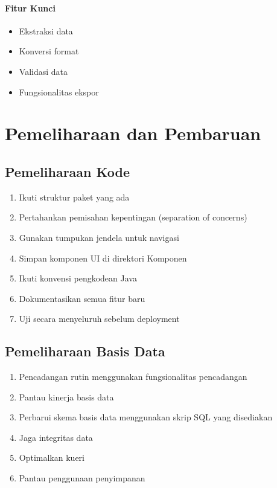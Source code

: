 \documentclass[12pt,a4paper]{article}
\begin{document}
\paragraph{Fitur Kunci}
\begin{itemize}
    \item Ekstraksi data
    \item Konversi format
    \item Validasi data
    \item Fungsionalitas ekspor
\end{itemize}

\section{Pemeliharaan dan Pembaruan}

\subsection{Pemeliharaan Kode}
\begin{enumerate}
    \item Ikuti struktur paket yang ada
    \item Pertahankan pemisahan kepentingan (separation of concerns)
    \item Gunakan tumpukan jendela untuk navigasi
    \item Simpan komponen UI di direktori Komponen
    \item Ikuti konvensi pengkodean Java
    \item Dokumentasikan semua fitur baru
    \item Uji secara menyeluruh sebelum deployment
\end{enumerate}

\subsection{Pemeliharaan Basis Data}
\begin{enumerate}
    \item Pencadangan rutin menggunakan fungsionalitas pencadangan
    \item Pantau kinerja basis data
    \item Perbarui skema basis data menggunakan skrip SQL yang disediakan
    \item Jaga integritas data
    \item Optimalkan kueri
    \item Pantau penggunaan penyimpanan
\end{enumerate}
\end{document}

